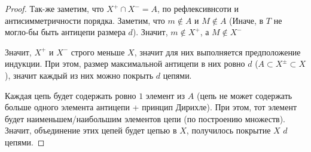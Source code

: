 \begin{theorem}
\begin{proof}
        Так-же заметим, что $X^{+}\cap X^{-} = A$, по рефлексивнсоти и антисимметричности порядка. Заметим, что $m \not\in A$ и $M \not\in A$ (Иначе, в $T$ не могло-бы быть антицепи размера $d$). Значит, $m \not\in X^{+}$, а $M \not\in X^{-}$ 

        Значит, $X^{+}$ и $X^{-}$ строго меньше $X$, значит для них выполняется предположение индукции. При этом, размер максимальной антицепи в них ровно $d$ ($A \subset X^{\pm} \subset X$), значит каждый из них можно покрыть $d$ цепями.

        Каждая цепь будет содержать ровно $1$ элемент из $A$ (цепь не может содержать больше одного элемента антицепи + принцип Дирихле). При этом, тот элемент будет наименьшем/наибольшим элементов цепи (по построению множеств). Значит, объединение этих цепей будет цепью в $X$, получилось покрытие $X$ $d$ цепями.
    \end{proof}
\end{theorem}
